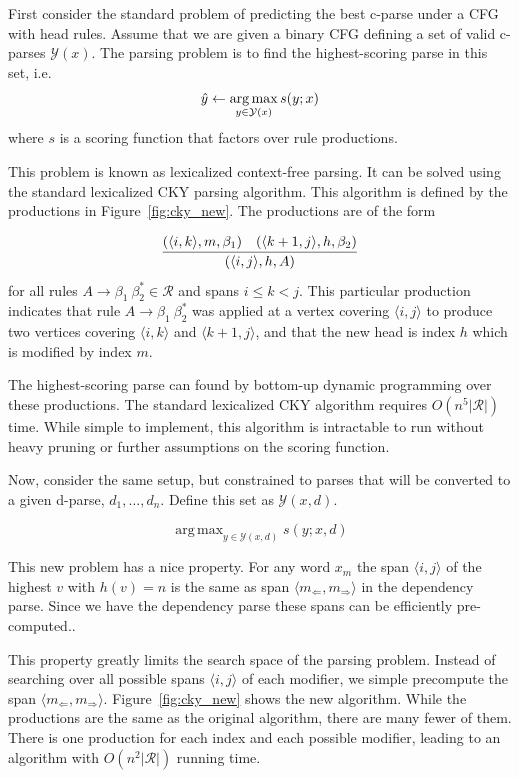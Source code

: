 \documentclass[11pt,letterpaper]{article}
\DeclareMathOperator*{\argmax}{arg\,max}
\newcommand{\rules}{\mathcal{R}}
\newcommand{\Left}[1]{#1_{\Leftarrow}}
\newcommand{\Right}[1]{#1_{\Rightarrow}}
\newcommand{\Span}[1]{\langle #1 \rangle}
\newcommand{\RuleB}[3]{#1 \rightarrow #2\ #3^*}
\begin{document}
First consider the standard problem of predicting the best c-parse under a CFG with head rules. 
Assume that we are given a binary CFG defining a set of valid c-parses $\mathcal{Y}(x)$.
The parsing problem is to find the highest-scoring parse in this set, i.e.  \[ \hat{y} \gets \argmax_{y \in {\cal Y}(x)} s(y;x) \] where
$s$ is a scoring function that factors over rule productions.

This problem is known as lexicalized context-free parsing. It can be
solved using the standard lexicalized CKY parsing algorithm.
This algorithm is defined by the productions
in Figure~\ref{fig:cky_new}. The productions are of the form

\[ \infer{(\Span{i, j}, h, A)}{(\Span{i, k}, m, \beta_1) & (\Span{k+1,
    j}, h, \beta_2)} \] for all rules $\RuleB{A}{\beta_1}{\beta_2}\in
\rules$ and spans $i \leq k < j$. This particular production indicates that
rule $\RuleB{A}{\beta_1}{\beta_2}$ was applied at a vertex covering
$\Span{i, j}$ to produce two vertices covering $\Span{i, k}$ and
$\Span{k+1, j}$, and that the new head is index $h$ which is modified
by index $m$.

The highest-scoring parse can found by bottom-up dynamic programming
over these productions. The standard lexicalized CKY algorithm requires $O(n^5
|\rules|)$ time. While simple to implement, this algorithm is intractable to run without heavy pruning or
further assumptions on the scoring function.

Now, consider the same setup, but constrained to parses
that will be converted to a given d-parse, $d_1, \ldots, d_n$.
Define this set as  $\mathcal{Y}(x,d)$.


\[ \argmax_{y \in \mathcal{Y}(x, d)} s(y; x, d)\]

This new problem has a nice property. For any word $x_m$ the span $\Span{i,j}$ of the highest $v$ with $h(v) = n$  is the same as span $\Span{\Left{m},\Right{m}}$ in the dependency parse. Since we have the dependency parse these spans can be efficiently pre-computed..

This property greatly limits the search space of the parsing problem.
Instead of searching over all possible spans $\Span{i, j}$ of each modifier, we simple precompute the span $\langle \Left{m},\Right{m}\rangle$. Figure~\ref{fig:cky_new} shows the new algorithm.
While the productions are the same as the original algorithm, there are many fewer of them. 
There is one production for each index and each possible modifier, leading to an algorithm with $O(n^2|\rules|)$ running time.
\end{document}
